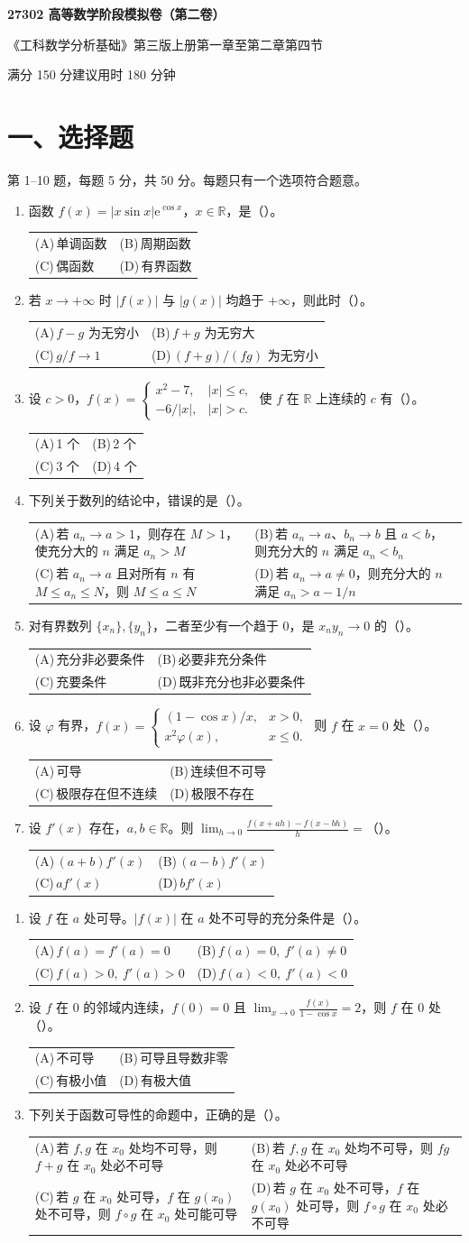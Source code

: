 \documentclass[UTF8,a4paper,zihao=-4,fontset=fandol]{ctexart}
\makeatletter
\newcommand{\choices}[4]{%
  \par\noindent\begin{tabularx}{\linewidth}{@{}X@{\hspace{1em}}X@{}}
    (A)\,#1 & (B)\,#2 \\
    (C)\,#3 & (D)\,#4
  \end{tabularx}\par}
\newcommand{\paper}[1]{%
  \pdfbookmark[0]{第#1卷}{paper.\thepage}%
  \begin{center}
    {\LARGE\bfseries 27302 高等数学阶段模拟卷（第#1卷）\par}
    \small 《工科数学分析基础》第三版上册第一章至第二章第四节\par
    满分 150 分\qquad 建议用时 180 分钟
  \end{center}
  \section*{一、选择题}
  第 1--10 题，每题 5 分，共 50 分。每题只有一个选项符合题意。}
\makeatother
\begin{document}
\paper{二}
\begin{enumerate}
\item 函数 $f(x)=|x\sin x|\mathrm{e}^{\cos x}$，$x\in\mathbb R$，是（\quad）。
\choices{单调函数}{周期函数}{偶函数}{有界函数}
\item 若 $x\to+\infty$ 时 $|f(x)|$ 与 $|g(x)|$ 均趋于 $+\infty$，则此时（\quad）。
\choices{$f-g$ 为无穷小}{$f+g$ 为无穷大}{$g/f\to1$}{$(f+g)/(fg)$ 为无穷小}
\item 设 $c>0$，$f(x)=\begin{cases}x^2-7,&|x|\le c,\\-6/|x|,&|x|>c.\end{cases}$
使 $f$ 在 $\mathbb R$ 上连续的 $c$ 有（\quad）。
\choices{1 个}{2 个}{3 个}{4 个}
\item 下列关于数列的结论中，错误的是（\quad）。
\choices{若 $a_n\to a>1$，则存在 $M>1$，使充分大的 $n$ 满足 $a_n>M$}
{若 $a_n\to a$、$b_n\to b$ 且 $a<b$，则充分大的 $n$ 满足 $a_n<b_n$}
{若 $a_n\to a$ 且对所有 $n$ 有 $M\le a_n\le N$，则 $M\le a\le N$}
{若 $a_n\to a\ne0$，则充分大的 $n$ 满足 $a_n>a-1/n$}
\item 对有界数列 $\{x_n\},\{y_n\}$，二者至少有一个趋于 $0$，是 $x_ny_n\to0$ 的（\quad）。
\choices{充分非必要条件}{必要非充分条件}{充要条件}{既非充分也非必要条件}
\item 设 $\varphi$ 有界，$f(x)=\begin{cases}(1-\cos x)/x,&x>0,\\x^2\varphi(x),&x\le0.\end{cases}$
则 $f$ 在 $x=0$ 处（\quad）。
\choices{可导}{连续但不可导}{极限存在但不连续}{极限不存在}
\item 设 $f'(x)$ 存在，$a,b\in\mathbb R$。则 $\displaystyle
\lim_{h\to0}\frac{f(x+ah)-f(x-bh)}{h}=$（\quad）。
\choices{$(a+b)f'(x)$}{$(a-b)f'(x)$}{$af'(x)$}{$bf'(x)$}
\end{enumerate}
\newpage
\begin{enumerate}[start=8]
\item 设 $f$ 在 $a$ 处可导。$|f(x)|$ 在 $a$ 处不可导的充分条件是（\quad）。
\choices{$f(a)=f'(a)=0$}{$f(a)=0,\ f'(a)\ne0$}{$f(a)>0,\ f'(a)>0$}{$f(a)<0,\ f'(a)<0$}
\item 设 $f$ 在 $0$ 的邻域内连续，$f(0)=0$ 且
$\displaystyle\lim_{x\to0}\frac{f(x)}{1-\cos x}=2$，则 $f$ 在 $0$ 处（\quad）。
\choices{不可导}{可导且导数非零}{有极小值}{有极大值}
\item 下列关于函数可导性的命题中，正确的是（\quad）。
\choices{若 $f,g$ 在 $x_0$ 处均不可导，则 $f+g$ 在 $x_0$ 处必不可导}
{若 $f,g$ 在 $x_0$ 处均不可导，则 $fg$ 在 $x_0$ 处必不可导}
{若 $g$ 在 $x_0$ 处可导，$f$ 在 $g(x_0)$ 处不可导，则 $f\circ g$ 在 $x_0$ 处可能可导}
{若 $g$ 在 $x_0$ 处不可导，$f$ 在 $g(x_0)$ 处可导，则 $f\circ g$ 在 $x_0$ 处必不可导}
\end{enumerate}
\end{document}
